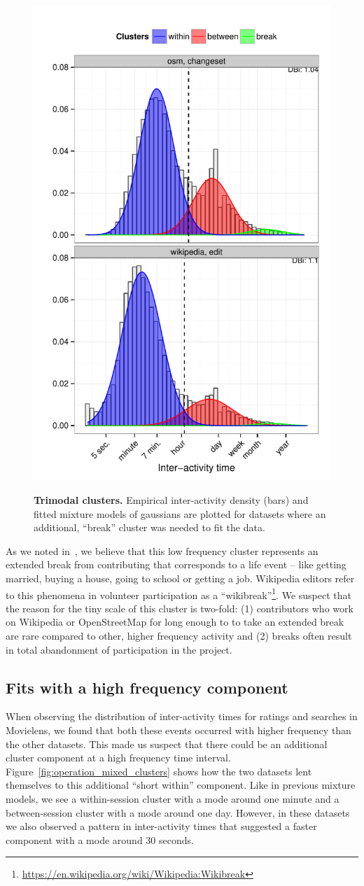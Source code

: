 \begin{figure}
\centering
\includegraphics[width=.45\textwidth]{figures/trimodal_clusters.pdf}
\label{fig:trimodal_clusters}
\caption{
    \textbf{Trimodal clusters.} Empirical inter-activity density (bars) and fitted mixture models of gaussians are plotted for datasets where an additional, ``break'' cluster was needed to fit the data.
}
\end{figure}

As we noted in~\cite{geiger2013using}, we believe that this low frequency cluster represents an extended break from contributing that corresponds to a life event -- like getting married, buying a house, going to school or getting a job.  Wikipedia editors refer to this phenomena in volunteer participation as a ``wikibreak''\footnote{\url{https://en.wikipedia.org/wiki/Wikipedia:Wikibreak}}.  We suspect that the reason for the tiny scale of this cluster is two-fold: (1) contributors who work on Wikipedia or OpenStreetMap for long enough to to take an extended break are rare compared to other, higher frequency activity and (2) breaks often result in total abandonment of participation in the project.

\subsection{Fits with a high frequency component}
When observing the distribution of inter-activity times for ratings and searches in Movielens, we found that both these events occurred with higher frequency than the other datasets.  This made us suspect that there could be an additional cluster component at a high frequency time interval.  Figure~\ref{fig:operation_mixed_clusters} shows how the two datasets lent themselves to this additional ``short within'' component.  Like in previous mixture models, we see a within-session cluster with a mode around one minute and a between-session cluster with a mode around one day.  However, in these datasets we also observed a pattern in inter-activity times that suggested a faster component with a mode around 30 seconds.

